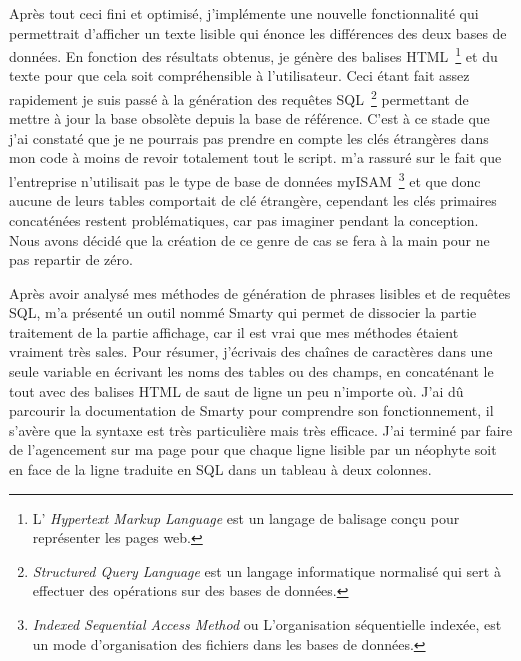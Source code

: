     Après tout ceci fini et optimisé, j'implémente une nouvelle
    fonctionnalité qui permettrait d'afficher un texte lisible qui énonce
    les différences des deux bases de données. En fonction des résultats
    obtenus, je génère des balises HTML\, \footnote{L’ \emph{Hypertext
    Markup Language} est un langage de balisage conçu pour représenter les
    pages web.} et du texte pour que cela soit compréhensible à
    l'utilisateur. Ceci étant fait assez rapidement je suis passé à la
    génération des requêtes SQL\, \footnote{\emph{Structured Query Language}
    est un langage informatique normalisé qui sert à effectuer des
    opérations sur des bases de données.} permettant de mettre à jour la
    base obsolète depuis la base de référence. C'est à ce stade que j'ai
    constaté que je ne pourrais pas prendre en compte les clés étrangères
    dans mon code à moins de revoir totalement tout le script.
     m'a rassuré sur le fait que l'entreprise n'utilisait
    pas le type de base de données myISAM\, \footnote{\emph{Indexed
    Sequential Access Method} ou L'organisation séquentielle indexée, est un
    mode d'organisation des fichiers dans les bases de données.} et que donc
    aucune de leurs tables comportait de clé étrangère, cependant les clés
    primaires concaténées restent problématiques, car pas imaginer pendant
    la conception. Nous avons décidé que la création de ce genre de cas se
    fera à la main pour ne pas repartir de zéro.

    Après avoir analysé mes méthodes de génération de phrases lisibles et de
    requêtes SQL,  m'a présenté un outil nommé \og Smarty
    \fg{} qui permet de dissocier la partie traitement de la partie
    affichage, car il est vrai que mes méthodes étaient vraiment très sales.
    Pour résumer, j'écrivais des chaînes de caractères dans une seule
    variable en écrivant les noms des tables ou des champs, en concaténant
    le tout avec des balises HTML de saut de ligne un peu n'importe où. J'ai
    dû parcourir la documentation de Smarty pour comprendre son
    fonctionnement, il s'avère que la syntaxe est très particulière mais
    très efficace. J'ai terminé par faire de l'agencement sur ma page pour
    que chaque ligne lisible par un néophyte soit en face de la ligne
    traduite en SQL dans un tableau à deux colonnes.
